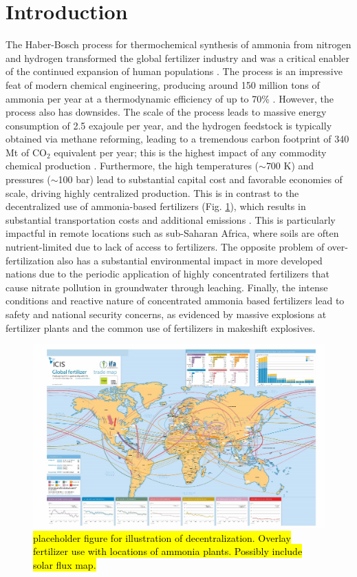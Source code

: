 \section{Introduction}

The Haber-Bosch process for thermochemical synthesis of ammonia from nitrogen and hydrogen transformed the global fertilizer industry and was a critical enabler of the continued expansion of human populations \cite{Smil_1999}. The process is an impressive feat of modern chemical engineering, producing around 150 million tons of ammonia per year at a thermodynamic efficiency of up to 70\% \cite{Schloegl_2003,Schiffer_2017}. However, the process also has downsides. The scale of the process leads to massive energy consumption of 2.5 exajoule per year, and the hydrogen feedstock is typically obtained via methane reforming, leading to a tremendous carbon footprint of 340 Mt of CO$_2$ equivalent per year; this is the highest impact of any commodity chemical production \cite{Schiffer_2017}. Furthermore, the high temperatures ($\sim$700 K) and pressures ($\sim$100 bar) lead to substantial capital cost and favorable economies of scale, driving highly centralized production. This is in contrast to the decentralized use of ammonia-based fertilizers (Fig. \ref{fig:usemap}), which results in substantial transportation costs and additional emissions \needcite. This is particularly impactful in remote locations such as sub-Saharan Africa, where soils are often nutrient-limited due to lack of access to fertilizers\cite{Gilbert_2012, Mueller_2012}. The opposite problem of over-fertilization also has a substantial environmental impact in more developed nations due to the periodic application of highly concentrated fertilizers that cause nitrate pollution in groundwater through leaching. Finally, the intense conditions and reactive nature of concentrated ammonia based fertilizers lead to safety and national security concerns, as evidenced by massive explosions at fertilizer plants and the common use of fertilizers in makeshift explosives.\cite{Marlair_2005}

\begin{figure}
    \centering
    \includegraphics[width=1\textwidth]{Figures/decentralization.jpg}
    \caption{\hl{placeholder figure for illustration of decentralization. Overlay fertilizer use with locations of ammonia plants. Possibly include solar flux map.}}
    \label{fig:usemap}
\end{figure}


